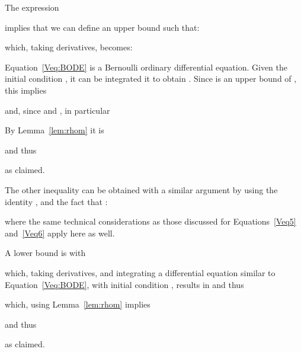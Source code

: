 \documentclass[11pt]{article}
\begin{document}
\vspace*{0.2in}








The expression

implies that we can define an upper bound  such that:
 
which, taking derivatives, becomes: 


Equation~\ref{Veq:BODE} is a Bernoulli ordinary differential equation. 
Given the initial condition , it can be integrated it to obtain
. 
Since  is an upper bound of , this implies

and, since  and , in particular


By Lemma~\ref{lem:rhom} it is

and thus

as claimed. 






The other inequality  can be obtained with a similar argument
	by using the identity , and the fact that :

where the same technical considerations as those discussed for Equations~\ref{Veq5} and~\ref{Veq6} apply here as well. 

A lower bound is  with
 
which, taking derivatives, and integrating a differential equation similar to Equation~\ref{Veq:BODE}, with initial condition , results in 
and thus

which, using Lemma~\ref{lem:rhom} implies

and thus
 
as claimed. 
\end{document}
